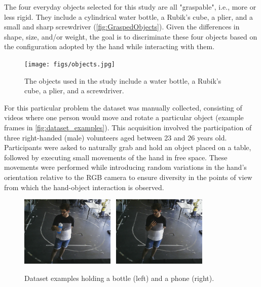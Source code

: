 The four everyday objects selected for this study are all "graspable", i.e., more or less rigid. They include a cylindrical water bottle, a Rubik's cube, a plier, and a small and sharp screwdriver (\autoref{fig:GraspedObjects}). Given the differences in shape, size, and/or weight, the goal is to discriminate these four objects based on the configuration adopted by the hand while interacting with them.

\begin{figure}[ht]
\captionsetup{width=0.7\textwidth}
\centering
\texttt{[image: figs/objects.jpg]}
\caption{The objects used in the study include a water bottle, a Rubik's cube, a plier, and a screwdriver.}
\label{fig:GraspedObjects}
\end{figure}

For this particular problem the dataset was manually collected, consisting of videos where one person would move and rotate a particular object (example frames in \autoref{fig:dataset_examples}). This acquisition involved the participation of three right-handed (male) volunteers aged between 23 and 26 years old. Participants were asked to naturally grab and hold an object placed on a table, followed by executing small movements of the hand in free space. These movements were performed while introducing random variations in the hand's orientation relative to the RGB camera to ensure diversity in the points of view from which the hand-object interaction is observed.

\begin{figure}[ht]
    \centerline{\includegraphics[width=0.4\textwidth]{figs/dataset_preprocessing1_1.png} \ \includegraphics[width=0.4\textwidth]{figs/dataset_preprocessing1_2.png}}
    \caption{Dataset examples holding a bottle (left) and a phone (right).}
    \label{fig:dataset_examples}
\end{figure}

